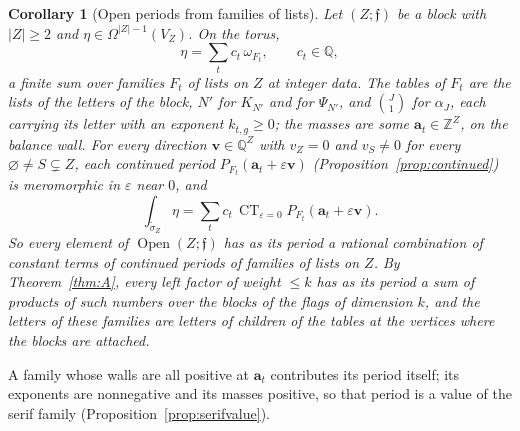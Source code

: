 \documentclass[11pt]{article}
\theoremstyle{plain}
\newtheorem{cor}[prop]{Corollary}
\theoremstyle{definition}
\theoremstyle{remark}
\newcommand{\Q}{\mathbb Q}
\newcommand{\Z}{\mathbb Z}
\newcommand{\ff}{\mathfrak f}
\newcommand{\Open}{\operatorname{Open}}
\newcommand{\tsig}{\widetilde\sigma}
\DeclareMathOperator*{\CT}{CT}
\begin{document}
\begin{cor}[Open periods from families of lists]\label{cor:serif}
Let $(Z;\ff)$ be a block with $|Z|\ge2$ and $\eta\in\Omega^{|Z|-1}(V_Z)$. On the torus,
\[
\eta=\sum_tc_t\,\omega_{F_t},\qquad c_t\in\Q,
\]
a finite sum over families $F_t$ of lists on $Z$ at integer data. The tables of $F_t$ are the lists of the letters of the block, $N'$ for $K_{N'}$ and for $\Psi_{N'}$, and $\binom J1$ for $\alpha_J$, each carrying its letter with an exponent $k_{t,g}\ge0$; the masses are some $\mathbf a_t\in\Z^Z$, on the balance wall. For every direction $\mathbf v\in\Q^Z$ with $v_Z=0$ and $v_S\neq0$ for every $\varnothing\neq S\subsetneq Z$, each continued period $P_{F_t}(\mathbf a_t+\varepsilon\mathbf v)$ (Proposition~\ref{prop:continued}) is meromorphic in $\varepsilon$ near $0$, and
\[
\int_{\tsig_Z}\eta=\sum_tc_t\,\CT_{\varepsilon=0}P_{F_t}(\mathbf a_t+\varepsilon\mathbf v).
\]
So every element of $\Open(Z;\ff)$ has as its period a rational combination of constant terms of continued periods of families of lists on $Z$. By Theorem~\ref{thm:A}, every left factor of weight $\le k$ has as its period a sum of products of such numbers over the blocks of the flags of dimension $k$, and the letters of these families are letters of children of the tables at the vertices where the blocks are attached.
\end{cor}

A family whose walls are all positive at $\mathbf a_t$ contributes its period itself; its exponents are nonnegative and its masses positive, so that period is a value of the serif family (Proposition~\ref{prop:serifvalue}).
\end{document}

